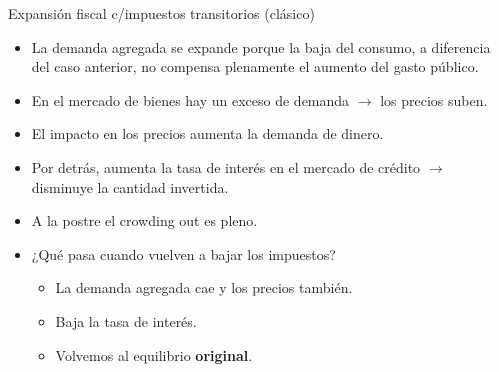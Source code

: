 \documentclass{beamer}
\begin{document}
\begin{frame}{Expansión fiscal c/impuestos transitorios (clásico)}
   
    \begin{itemize}
        \item La demanda agregada se expande porque la baja del consumo, a diferencia del caso anterior, no compensa plenamente el aumento del gasto público.
        \item En el mercado de bienes hay un exceso de demanda $\rightarrow$ los precios suben.
        \item El impacto en los precios aumenta la demanda de dinero.
        \item Por detrás, aumenta la tasa de interés en el mercado de crédito $\rightarrow$ disminuye la cantidad invertida.
        \item A la postre el crowding out es pleno.
        \item ¿Qué pasa cuando vuelven a bajar los impuestos?
        \begin{itemize}
            \item La demanda agregada cae y los precios también.
            \item Baja la tasa de interés.
            \item Volvemos al equilibrio \textbf{original}.
        \end{itemize}
    \end{itemize}
\end{frame}
\end{document}
